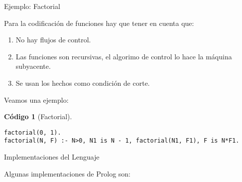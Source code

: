 \documentclass[xcolor=dvipsnames]{beamer}
\newtheorem{codigo}{Código}
\begin{document}
\begin{frame}[fragile]{Ejemplo: Factorial}
 
Para la codificación de funciones hay que tener en cuenta que:

\begin{enumerate}
 \item No hay flujos de control.
 \item Las funciones son recursivas, el algorimo de control lo hace la máquina subyacente.
 \item Se usan los hechos como condición de corte. 
\end{enumerate}

Veamos una ejemplo:
\begin{codigo}[Factorial]
\begin{lstlisting}
factorial(0, 1).
factorial(N, F) :- N>0, N1 is N - 1, factorial(N1, F1), F is N*F1.
\end{lstlisting}

\end{codigo}


\end{frame}



\begin{frame}[containsverbatim]{Implementaciones del Lenguaje}

Algunas implementaciones de Prolog son:


\end{frame}
\end{document}

